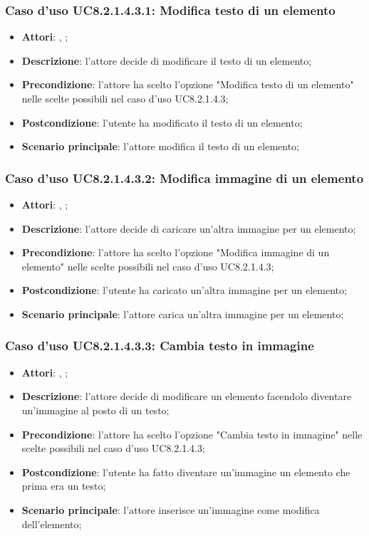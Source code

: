 		\subsubsection{Caso d'uso UC8.2.1.4.3.1: Modifica testo di un elemento}
		\label{UC8.2.1.4.3.1}
		\begin{itemize}
			\item \textbf{Attori}: \uau, \uaupro;
			\item \textbf{Descrizione}: l'attore decide di modificare il testo di un elemento;
			\item \textbf{Precondizione}: l'attore ha scelto l'opzione "Modifica testo di un elemento" nelle scelte possibili nel caso d'uso UC8.2.1.4.3;
			\item \textbf{Postcondizione}: l'utente ha modificato il testo di un elemento;
			\item \textbf{Scenario principale}: l'attore modifica il testo di un elemento;  
		\end{itemize}
		
		\subsubsection{Caso d'uso UC8.2.1.4.3.2: Modifica immagine di un elemento}
		\label{UC8.2.1.4.3.2}
		\begin{itemize}
			\item \textbf{Attori}: \uau, \uaupro;
			\item \textbf{Descrizione}: l'attore decide di caricare un'altra immagine per un elemento;
			\item \textbf{Precondizione}: l'attore ha scelto l'opzione "Modifica immagine di un elemento" nelle scelte possibili nel caso d'uso UC8.2.1.4.3;
			\item \textbf{Postcondizione}: l'utente ha caricato un'altra immagine per un elemento;
			\item \textbf{Scenario principale}: l'attore carica un'altra immagine per un elemento;
		\end{itemize}
		
		\subsubsection{Caso d'uso UC8.2.1.4.3.3: Cambia testo in immagine}
		\label{UC8.2.1.4.3.3}
		\begin{itemize}
			\item \textbf{Attori}: \uau, \uaupro;
			\item \textbf{Descrizione}: l'attore decide di modificare un elemento facendolo diventare un'immagine al posto di un testo;
			\item \textbf{Precondizione}: l'attore ha scelto l'opzione "Cambia testo in immagine" nelle scelte possibili nel caso d'uso UC8.2.1.4.3;
			\item \textbf{Postcondizione}: l'utente ha fatto diventare un'immagine un elemento che prima era un testo;
			\item \textbf{Scenario principale}: l'attore inserisce un'immagine come modifica dell'elemento;  
		\end{itemize}
		
